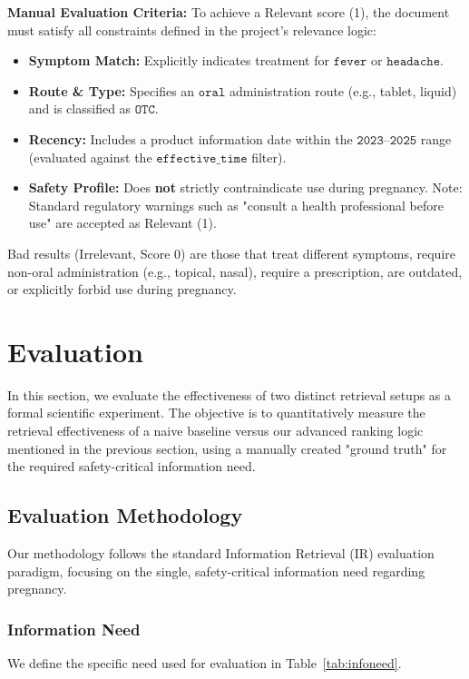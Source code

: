 \textbf{Manual Evaluation Criteria:}
To achieve a Relevant score (1), the document must satisfy all constraints defined in the project's relevance logic:

\begin{itemize}
    \item \textbf{Symptom Match:} Explicitly indicates treatment for $\texttt{fever}$ or $\texttt{headache}$.
    \item \textbf{Route \& Type:} Specifies an $\texttt{oral}$ administration route (e.g., tablet, liquid) and is classified as $\texttt{OTC}$.
    \item \textbf{Recency:} Includes a product information date within the $\texttt{2023–2025}$ range (evaluated against the $\texttt{effective\_time}$ filter).
    \item \textbf{Safety Profile:} Does \textbf{not} strictly contraindicate use during pregnancy. Note: Standard regulatory warnings such as "consult a health professional before use" are accepted as Relevant (1).
\end{itemize}

Bad results (Irrelevant, Score 0) are those that treat different symptoms, require non-oral administration (e.g., topical, nasal), require a prescription, are outdated, or explicitly forbid use during pregnancy.

\section{Evaluation}
In this section, we evaluate the effectiveness of two distinct retrieval setups as a formal scientific experiment. The objective is to quantitatively measure the retrieval effectiveness of a naive baseline versus our advanced ranking logic mentioned in the previous section, using a manually created "ground truth" for the required safety-critical information need.

\subsection{Evaluation Methodology}

Our methodology follows the standard Information Retrieval (IR) evaluation paradigm, focusing on the single, safety-critical information need regarding pregnancy.

\subsubsection{Information Need}
We define the specific need used for evaluation in Table~\ref{tab:infoneed}.


